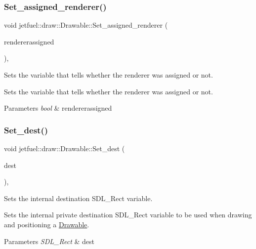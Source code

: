 \subsubsection{\texorpdfstring{Set\+\_\+assigned\+\_\+renderer()}{Set\_assigned\_renderer()}}
{\footnotesize\ttfamily void jetfuel\+::draw\+::\+Drawable\+::\+Set\+\_\+assigned\+\_\+renderer (\begin{DoxyParamCaption}\item[{bool}]{rendererassigned }\end{DoxyParamCaption})\hspace{0.3cm}{\ttfamily [inline]}, {\ttfamily [protected]}}



Sets the variable that tells whether the renderer was assigned or not. 

Sets the variable that tells whether the renderer was assigned or not.


\begin{DoxyParams}{Parameters}
{\em bool} & rendererassigned \\
\hline
\end{DoxyParams}
\mbox{\label{classjetfuel_1_1draw_1_1Drawable_a75a4f944021825be72d3d7f3da7e1093}} 
\subsubsection{\texorpdfstring{Set\+\_\+dest()}{Set\_dest()}}
{\footnotesize\ttfamily void jetfuel\+::draw\+::\+Drawable\+::\+Set\+\_\+dest (\begin{DoxyParamCaption}\item[{const S\+D\+L\+\_\+\+Rect}]{dest }\end{DoxyParamCaption})\hspace{0.3cm}{\ttfamily [inline]}, {\ttfamily [protected]}}



Sets the internal destination S\+D\+L\+\_\+\+Rect variable. 

Sets the internal private destination S\+D\+L\+\_\+\+Rect variable to be used when drawing and positioning a \hyperlink{classjetfuel_1_1draw_1_1Drawable}{Drawable}.


\begin{DoxyParams}{Parameters}
{\em S\+D\+L\+\_\+\+Rect} & dest \\
\hline
\end{DoxyParams}
\mbox{\label{classjetfuel_1_1draw_1_1Drawable_afdd035afe40c706459a6c9df813bcce6}} 
